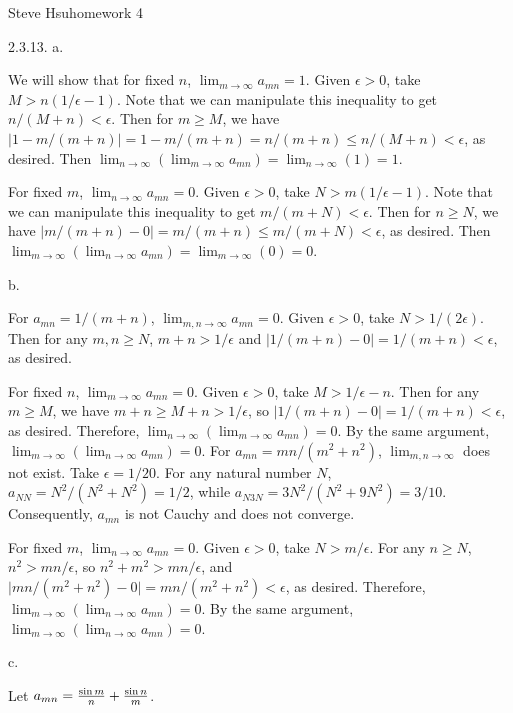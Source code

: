 \def\abs#1{\vert{#1}\vert}
\overfullrule=0pt
\centerline{Steve Hsu\hfill homework 4}
\item{2.3.13.} a.

We will show that for fixed $n$, $\lim _{m \to \infty} a_{mn} = 1$.
Given $\epsilon > 0$, take $M > n(1/\epsilon - 1)$.
Note that we can manipulate this inequality to get $n/(M + n) < \epsilon$.
Then for $m \ge M$, we have $\abs{1 - m/(m + n)} =
1 - m/(m + n) = n/(m + n) \le n/(M + n) < \epsilon$, as desired.
Then $\lim _{n \to \infty} (\lim _{m \to \infty} a_{mn}) = \lim _{n \to \infty} (1) = 1$.

For fixed $m$, $\lim _{n \to \infty} a_{mn} = 0$.
Given $\epsilon > 0$, take $N > m(1/\epsilon - 1)$.
Note that we can manipulate this inequality to get $m/(m + N) < \epsilon$.
Then for $n \ge N$, we have $\abs{m/(m + n) - 0} = m/(m + n) \le
m/(m + N) < \epsilon$, as desired.
Then $\lim _{m \to \infty} (\lim _{n \to \infty} a_{mn}) = \lim _{m \to \infty} (0) = 0$.
\medskip
\item{} b.

For $a_{mn} = 1/(m + n)$, $\lim _{m,n \to \infty} a_{mn} = 0$.
Given $\epsilon > 0$, take $N > 1/(2\epsilon)$.
Then for any $m,n \ge N$, $m + n > 1/\epsilon$ and
$\abs{1/(m + n) - 0} = 1/(m + n) < \epsilon$, as desired.

For fixed $n$, $\lim _{m \to \infty} a_{mn} = 0$.
Given $\epsilon > 0$, take $M > 1/\epsilon - n$.
Then for any $m \ge M$, we have $m + n \ge M + n > 1/\epsilon$,
so $\abs{1/(m + n) - 0} = 1/(m + n) < \epsilon$, as desired.
Therefore, $\lim _{n \to \infty} (\lim _{m \to \infty} a_{mn}) = 0$.
By the same argument, $\lim _{m \to \infty} (\lim _{n \to \infty} a_{mn}) = 0$.
\smallskip
For $a_{mn} = mn/(m^2 + n^2)$, $\lim _{m,n \to \infty}$ does not exist.
Take $\epsilon = 1/20$.
For any natural number $N$, $a_{NN} = N^2 / (N^2 + N^2) = 1/2$,
while $a_{N3N} = 3N^2 / (N^2 + 9N^2) = 3/10$.
Consequently, $a_{mn}$ is not Cauchy and does not converge.

For fixed $m$, $\lim _{n \to \infty} a_{mn} = 0$.
Given $\epsilon > 0$, take $N > m/\epsilon$.
For any $n \ge N$, $n^2 > mn/\epsilon$, so $n^2 + m^2 > mn/\epsilon$,
and $\abs{mn/(m^2 + n^2) - 0} = mn/(m^2 + n^2) < \epsilon$, as desired.
Therefore, $\lim _{m \to \infty} (\lim _{n \to \infty} a_{mn}) = 0$.
By the same argument, $\lim _{m \to \infty} (\lim _{n \to \infty} a_{mn}) = 0$.
\medskip
\item{} c.

Let $a_{mn} = {\sin m \over n} + {\sin n \over m}$.

